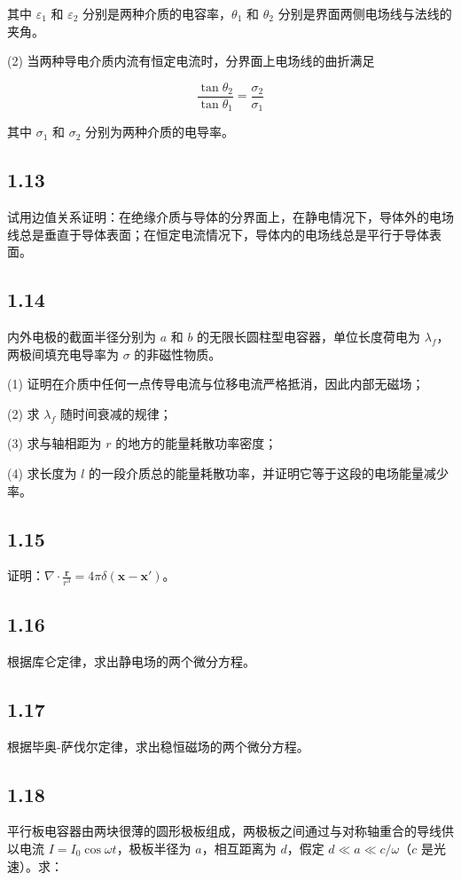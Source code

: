 其中 $\varepsilon_1$ 和 $\varepsilon_2$ 分别是两种介质的电容率，$\theta_1$ 和 $\theta_2$ 分别是界面两侧电场线与法线的夹角。

(2) 当两种导电介质内流有恒定电流时，分界面上电场线的曲折满足

$$\frac{\tan\theta_2}{\tan\theta_1} = \frac{\sigma_2}{\sigma_1}$$

其中 $\sigma_1$ 和 $\sigma_2$ 分别为两种介质的电导率。

\newpage
\subsection{1.13}
试用边值关系证明：在绝缘介质与导体的分界面上，在静电情况下，导体外的电场线总是垂直于导体表面；在恒定电流情况下，导体内的电场线总是平行于导体表面。

\newpage
\subsection{1.14}
内外电极的截面半径分别为 $a$ 和 $b$ 的无限长圆柱型电容器，单位长度荷电为 $\lambda_f$，两极间填充电导率为 $\sigma$ 的非磁性物质。

(1) 证明在介质中任何一点传导电流与位移电流严格抵消，因此内部无磁场；

(2) 求 $\lambda_f$ 随时间衰减的规律；

(3) 求与轴相距为 $r$ 的地方的能量耗散功率密度；

(4) 求长度为 $l$ 的一段介质总的能量耗散功率，并证明它等于这段的电场能量减少率。

\newpage
\subsection{1.15}
证明：$\nabla \cdot \frac{\boldsymbol{r}}{r^3} = 4\pi \delta(\boldsymbol{x} - \boldsymbol{x}')$。

\newpage
\subsection{1.16}
根据库仑定律，求出静电场的两个微分方程。

\newpage
\subsection{1.17}
根据毕奥-萨伐尔定律，求出稳恒磁场的两个微分方程。

\newpage
\subsection{1.18}
平行板电容器由两块很薄的圆形极板组成，两极板之间通过与对称轴重合的导线供以电流 $I = I_0 \cos \omega t$，极板半径为 $a$，相互距离为 $d$，假定 $d \ll a \ll c/\omega$（$c$ 是光速）。求：

